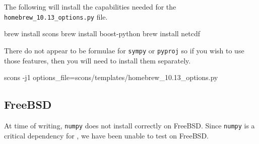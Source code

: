 The following will install the capabilities needed for the \texttt{homebrew_10.13_options.py} file.

\begin{shellCode}
brew install scons
brew install boost-python
brew install netcdf
\end{shellCode}

There do not appear to be formulae for \texttt{sympy} or \texttt{pyproj} so if you wish to use those features, then
you will need to install them separately.


\begin{shellCode}
scons -j1 options_file=scons/templates/homebrew_10.13_options.py
\end{shellCode}


\subsection{FreeBSD}\label{sec:freebsdsrc}

At time of writing, \texttt{numpy} does not install correctly on FreeBSD.
Since \texttt{numpy} is a critical dependency for \escript, we have been unable to test on FreeBSD.


